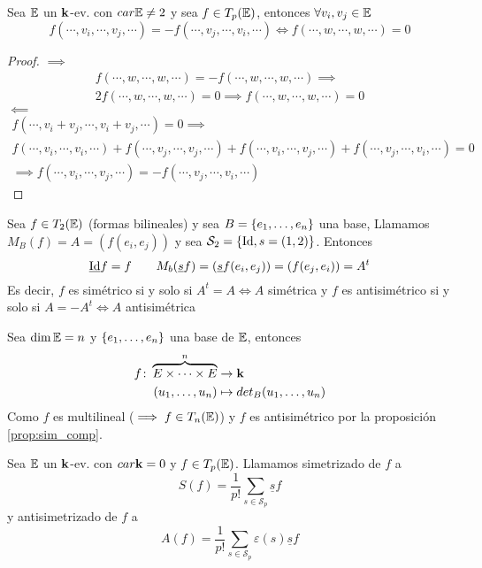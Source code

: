 \begin{prop}
    Sea $\mathbb{E}$ un $\mathbf{k}$-ev. con $car \mathbb{E} \neq 2$ y sea $f \in T_p(\mathbb{E})$, entonces $\forall v_i, v_j \in \mathbb{E}$
    \[
        f(\cdots, v_i, \cdots, v_j, \cdots) = -f(\cdots,v_j,\cdots,v_i,\cdots) \iff
        f(\cdots, w, \cdots, w, \cdots) = 0
    \]
\end{prop}
\begin{proof}
    $\implies$
    \begin{gather*}
        f(\cdots,w,\cdots,w,\cdots) = - f(\cdots,w,\cdots,w,\cdots) \implies \\
        2f(\cdots,w,\cdots,w,\cdots) = 0 \implies f(\cdots,w,\cdots,w,\cdots) = 0
    \end{gather*}
    $\impliedby$
    \begin{gather*}
        f(\cdots, v_i+v_j, \cdots, v_i+v_j, \cdots) = 0 \implies \\
        f(\cdots,v_i,\cdots,v_i,\cdots) + f(\cdots,v_j,\cdots,v_j,\cdots) +
        f(\cdots,v_i,\cdots,v_j,\cdots) + f(\cdots,v_j,\cdots,v_i,\cdots) = 0 \\
        \implies f(\cdots,v_i,\cdots,v_j,\cdots) = -f(\cdots,v_j,\cdots,v_i,\cdots)
    \end{gather*}
\end{proof}
\begin{example}
    Sea $f \in T_2(\mathbb{E})$ (formas bilineales) y sea $B = \left\{e_1,\dots,e_n\right\}$ una base,
    Llamamos $M_B(f) = A = \left( f(e_i,e_j) \right)$ y sea $\mathcal{S}_2 = \left\{\operatorname{Id}, s=(1,2)\right\}$.
    Entonces
    \[
        \underline{\operatorname{Id}}f = f \qquad M_b(\underline{s}f)= \left( \underline{s}f(e_i,e_j) \right)
        = \left( f(e_j,e_i) \right) = A^t
    \]
    Es decir, $f$ es simétrico si y solo si $A^t = A \iff A$ simétrica y $f$ es
    antisimétrico si y solo si $A = -A^t \iff A$ antisimétrica
\end{example}
\begin{example}
    Sea $\dim \mathbb{E} = n$ y $\left\{e_1,\dots,e_n\right\}$ una base de $\mathbb{E}$, entonces
    \[
        \begin{aligned}
            f \colon \overbrace{E \times \cdots \times E}^n &\to \mathbf{k} \\
            (u_1,\dots,u_n) &\mapsto det_B(u_1,\dots,u_n)
        \end{aligned}
    \]
    Como $f$ es multilineal ($\implies f \in T_n(\mathbb{E})$) y $f$ es antisimétrico
    por la proposición \ref{prop:sim_comp}.
\end{example}
\begin{defi}
    Sea $\mathbb{E}$ un $\mathbf{k}$-ev. con $car \mathbf{k} = 0$ y $f \in T_p(\mathbb{E})$. Llamamos simetrizado de $f$ a
    \[
        S(f) = \frac{1}{p!}\sum_{s \in \mathcal{S}_p} \underline{s}f
    \]
    y antisimetrizado de $f$ a
    \[
        A(f) = \frac{1}{p!}\sum_{s \in \mathcal{S}_p} \varepsilon(s)\underline{s}f
    \]
\end{defi}

